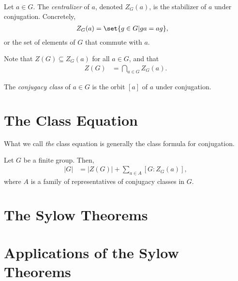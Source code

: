 \documentclass[10pt]{mypackage}
\begin{document}
\begin{definition}
  Let $a\in G$. The \textit{centralizer} of $a$, denoted $Z_G(a)$, is the stabilizer of $a$ under conjugation. Concretely,
  \begin{align*}
    Z_G(a) &= \set{g\in G | ga = ag},
  \end{align*}
  or the set of elements of $G$ that commute with $a$.\newline

  Note that $Z(G)\subseteq Z_G(a)$ for all $a\in G$, and that
  \begin{align*}
    Z(G) &= \bigcap_{a\in G} Z_G(a).
  \end{align*}
\end{definition}
\begin{definition}
  The \textit{conjugacy class} of $a\in G$ is the orbit $\left[ a \right]$ of $a$ under conjugation.
\end{definition}
\section{The Class Equation}%
What we call \textsl{the} class equation is generally the class formula for conjugation.
\begin{definition}
  Let $G$ be a finite group. Then,
  \begin{align*}
    \left\vert G \right\vert &= \left\vert Z(G) \right\vert + \sum_{a\in A} \left[ G:Z_G(a) \right],
  \end{align*}
  where $A$ is a family of representatives of conjugacy classes in $G$.
\end{definition}
\section{The Sylow Theorems}%
\section{Applications of the Sylow Theorems}%
\end{document}
